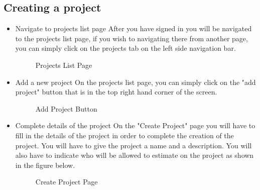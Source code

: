 \subsection{Creating a project}
\begin{itemize}
	\item{Navigate to projects list page}
	\newline
	After you have signed in you will be navigated to the projects list page, if you wish to navigating there from another page, you can simply click on the projects tab on the left side navigation bar.
	\begin{figure}[H]
	    	\centering
	    	\caption{Projects List Page}
	    	\label{fig:Learning rate 0.1}
   	\end{figure}
	\item{Add a new project}
	\newline
	On the projects list page, you can simply click on the "add project" button that is in the top right hand corner of the screen.
	\begin{figure}[H]
	    	\centering
	    	\caption{Add Project Button}
	    	\label{fig:Learning rate 0.1}
   	\end{figure}
	\item{Complete details of the project}
	\newline
	On the "Create Project" page you will have to fill in the details of the project in order to complete the creation of the project. You will have to give the project a name and a description. You will also have to indicate who will be allowed to estimate on the project as shown in the figure below.
	\begin{figure}[H]
	    	\centering
	    	\caption{Create Project Page}
	    	\label{fig:Learning rate 0.1}
   	\end{figure}
\end{itemize}
